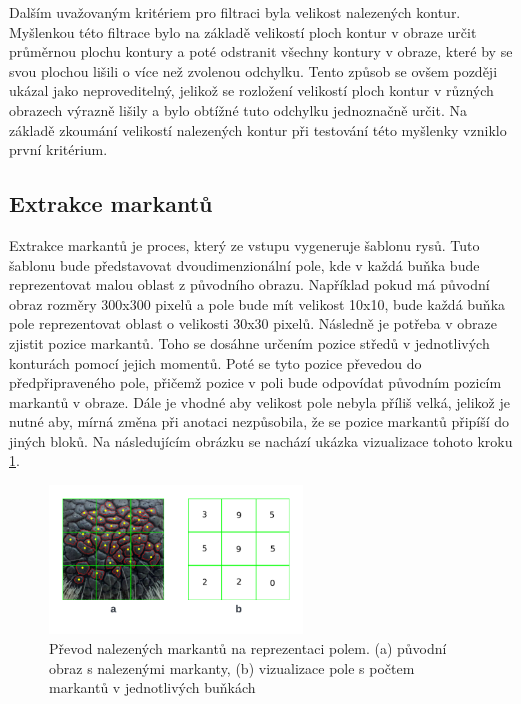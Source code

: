 Dalším uvažovaným kritériem pro filtraci byla velikost nalezených kontur. Myšlenkou této filtrace bylo na základě velikostí ploch kontur v obraze určit průměrnou plochu kontury a poté odstranit všechny kontury v obraze, které by se svou plochou lišili o více než zvolenou odchylku. Tento způsob se ovšem později ukázal jako neproveditelný, jelikož se rozložení velikostí ploch kontur v různých obrazech výrazně lišily a bylo obtížné tuto odchylku jednoznačně určit. Na základě zkoumání velikostí nalezených kontur při testování této myšlenky vzniklo první kritérium.


\subsection{Extrakce markantů}
Extrakce markantů je proces, který ze vstupu vygeneruje šablonu rysů. Tuto šablonu bude představovat dvoudimenzionální pole, kde v každá buňka bude reprezentovat malou oblast z původního obrazu. Například pokud má původní obraz rozměry 300x300 pixelů a pole bude mít velikost 10x10, bude každá buňka pole reprezentovat oblast o velikosti 30x30 pixelů. Následně je potřeba v obraze zjistit pozice markantů. Toho se dosáhne určením pozice středů v jednotlivých konturách pomocí jejich momentů. Poté se tyto pozice převedou do předpřipraveného pole, přičemž pozice v poli bude odpovídat původním pozicím markantů v obraze. Dále je vhodné aby velikost pole nebyla příliš velká, jelikož je nutné aby, mírná změna při anotaci nezpůsobila, že se pozice markantů připíší do jiných bloků. Na následujícím obrázku se nachází ukázka vizualizace tohoto kroku \ref{markant2pole}.


\begin{figure}[h]
	\centering
	\includegraphics[width=0.6\textwidth]{obrazky/extrakce.png}
	\caption{Převod nalezených markantů na reprezentaci polem. (a) původní obraz s nalezenými markanty, (b) vizualizace pole s počtem markantů v jednotlivých buňkách}
	\label{markant2pole}
\end{figure} 

